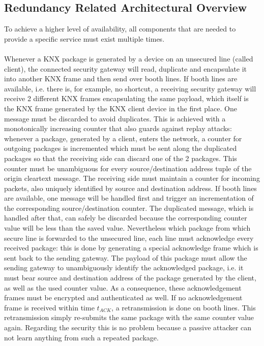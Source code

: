 \subsection{Redundancy Related Architectural Overview}

To achieve a higher level of availability, all components that are needed to provide a specific service must exist multiple times. 
\\
\\
Whenever a KNX package is
generated by a device on an unsecured line (called client), the connected security gateway will read, duplicate and encapsulate it into another KNX frame 
and then send over booth lines. If booth lines are available, i.e. there is, for example, no shortcut, a receiving security gateway will receive 2
different KNX frames encapsulating the same
payload, which itself is the KNX frame generated by the KNX client device in the first place. One message must be discarded to avoid duplicates. This is 
achieved with a monotonically increasing counter that also guards against replay attacks: whenever a package, generated by a client, enters the
network, a counter for outgoing packages is incremented
which must be sent along the duplicated packages so that the receiving side can discard one of the 2 packages. This counter must be
unambiguous for every source/destination address tuple of the origin cleartext message. The receiving side must maintain a counter for incoming packets, 
also uniquely identified by source and destination address. If booth lines are available, one message will be handled first and trigger an incrementation of the
corresponding source/destination counter. The duplicated message, which is handled after that, can safely be discarded because the corresponding counter
value will be less than the saved value. Nevertheless which package from which secure line is forwarded to the unsecured line, each line must acknowledge
every received package: this is done by generating a special acknowledge frame which is sent back to the sending gateway. The payload of this package must
allow the sending gateway to unambiguously identify the acknowledged package, i.e. it must bear source and destination address of the package generated
by the client, as well as the used counter value. As a consequence, these acknowledgement frames must be encrypted and authenticated as well.
If no acknowledgement frame is received within time $t_{ACK}$, a retransmission is done on booth lines. This retransmission simply re-submits the same
package with the same counter value again. Regarding the security this is no problem because a passive attacker can not learn anything from such a repeated
package.


